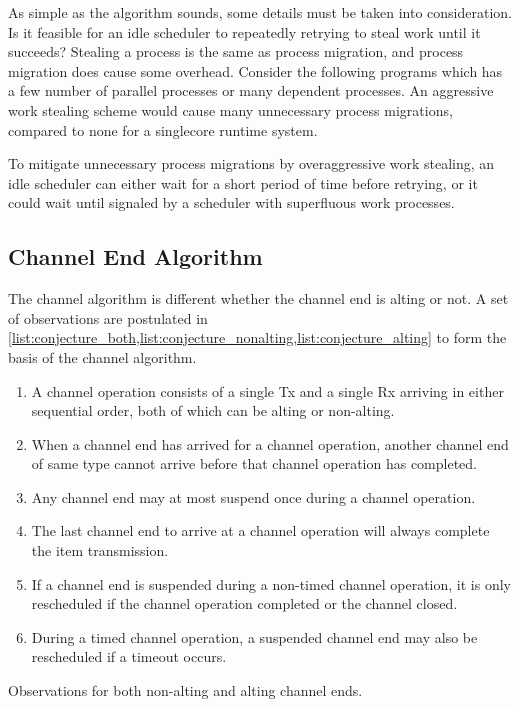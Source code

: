 As simple as the algorithm sounds, some details must be taken into consideration. Is it feasible for an idle scheduler to repeatedly retrying to steal work until it succeeds? Stealing a process is the same as process migration, and process migration does cause some overhead. Consider the following programs which has a few number of parallel processes or many dependent processes. An aggressive work stealing scheme would cause many unnecessary process migrations, compared to none for a singlecore runtime system. 

To mitigate unnecessary process migrations by overaggressive work stealing, an idle scheduler can either wait for a short period of time before retrying, or it could wait until signaled by a scheduler with superfluous work processes. 


\subsection{Channel End Algorithm}


The channel algorithm is different whether the channel end is alting or not. A set of observations are postulated in \cref{list:conjecture_both,list:conjecture_nonalting,list:conjecture_alting} to form the basis of the channel algorithm.

\FloatBarrier

\begin{enumeratefloat}
    \begin{enumerate}[topsep=0em,itemsep=-1em,partopsep=0.5em,parsep=1em]
        \item A channel operation consists of a single Tx and a single Rx arriving in either sequential order, both of which can be alting or non\hyp{}alting.
        \item When a channel end has arrived for a channel operation, another channel end of same type cannot arrive before that channel operation has completed.
        \item Any channel end may at most suspend once during a channel operation.
        \item The last channel end to arrive at a channel operation will always complete the item transmission.
        \item If a channel end is suspended during a non\hyp{}timed channel operation, it is only rescheduled if the channel operation completed or the channel closed.
        \item During a timed channel operation, a suspended channel end may also be rescheduled if a timeout occurs.
    \end{enumerate}
    \caption{Observations for both non\hyp{}alting and alting channel ends.}
    \label{list:conjecture_both}
\end{enumeratefloat}

